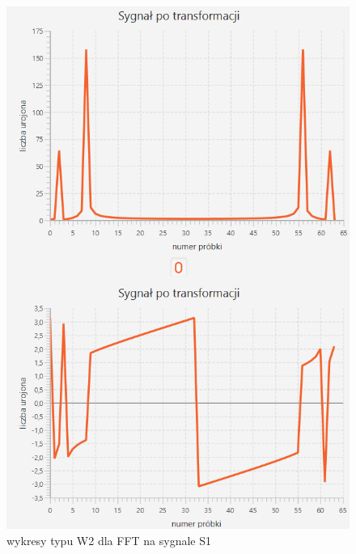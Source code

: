 \documentclass[12pt]{article}
\begin{document}
\begin{figure}[H]
	\centering
	\includegraphics[width=\linewidth]{S1_FFT_W2.png}
	\caption{wykresy typu W2 dla FFT na sygnale S1}
	\label{S1_FFT_W2}
\end{figure}
\end{document}
